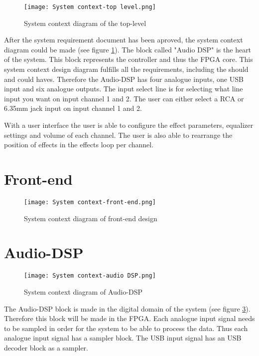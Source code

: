 \begin{figure}[h]
    \texttt{[image: System context-top level.png]}
    \caption{System context diagram of the top-level}
    \label{fig:sys-context-top}
\end{figure}

After the system requirement document has been aproved, the system context diagram could be made (see figure \ref{fig:sys-context-top}).
The block called "Audio DSP" is the heart of the system.
This block represents the controller and thus the FPGA core.
This system context design diagram fulfills all the requirements, including the should and could haves.
Therefore the Audio-DSP has four analogue inputs, one USB input and six analogue outputs.
The input select line is for selecting what line input you want on input channel 1 and 2.
The user can either select a RCA or 6.35mm jack input on input channel 1 and 2.

With a user interface the user is able to configure the effect parameters, equalizer settings and volume of each channel.
The user is also able to rearrange the position of effects in the effects loop per channel.

\section{Front-end}
\begin{figure}[h]
    \texttt{[image: System context-front-end.png]}
    \caption{System context diagram of front-end design}
    \label{fig:system-context-front-end}
\end{figure}

\section{Audio-DSP}
\begin{figure}[h]
    \texttt{[image: System context-audio DSP.png]}
    \caption{System context diagram of Audio-DSP}
    \label{fig:sys-context-audio-dsp}
\end{figure}

The Audio-DSP block is made in the digital domain of the system (see figure \ref{fig:sys-context-audio-dsp}). 
Therefore this block will be made in the FPGA. Each analogue input signal needs to be sampled in order for the system to be able to process the data. 
Thus each analogue input signal has a sampler block. The USB input signal has an USB decoder block as a sampler. 

